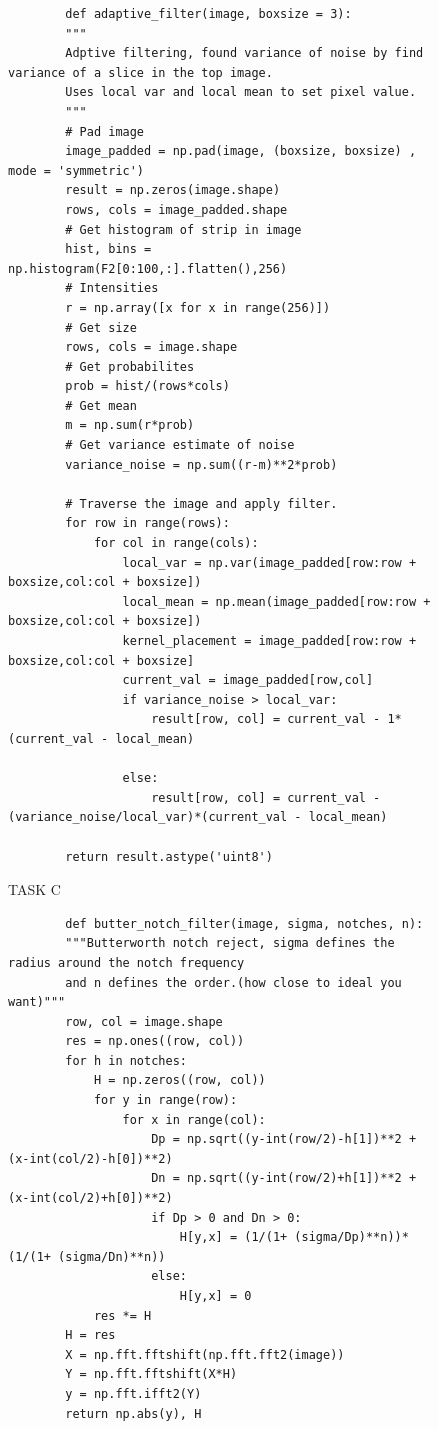 {\begin{figure}[H]
\begin{lstlisting}
        def adaptive_filter(image, boxsize = 3):
        """
        Adptive filtering, found variance of noise by find variance of a slice in the top image.
        Uses local var and local mean to set pixel value.
        """
        # Pad image
        image_padded = np.pad(image, (boxsize, boxsize) , mode = 'symmetric')
        result = np.zeros(image.shape)
        rows, cols = image_padded.shape
        # Get histogram of strip in image
        hist, bins = np.histogram(F2[0:100,:].flatten(),256)
        # Intensities
        r = np.array([x for x in range(256)])
        # Get size
        rows, cols = image.shape
        # Get probabilites
        prob = hist/(rows*cols)
        # Get mean
        m = np.sum(r*prob)
        # Get variance estimate of noise
        variance_noise = np.sum((r-m)**2*prob)
        
        # Traverse the image and apply filter.
        for row in range(rows):
            for col in range(cols):
                local_var = np.var(image_padded[row:row + boxsize,col:col + boxsize])
                local_mean = np.mean(image_padded[row:row + boxsize,col:col + boxsize])
                kernel_placement = image_padded[row:row + boxsize,col:col + boxsize] 
                current_val = image_padded[row,col]
                if variance_noise > local_var:
                    result[row, col] = current_val - 1*(current_val - local_mean)
                
                else:
                    result[row, col] = current_val - (variance_noise/local_var)*(current_val - local_mean)
        
        return result.astype('uint8')
    \end{lstlisting}
\caption{TASK C}
\label{TASK C}
\end{figure}




\begin{figure}[H]
    \begin{lstlisting}
        def butter_notch_filter(image, sigma, notches, n):
        """Butterworth notch reject, sigma defines the radius around the notch frequency
        and n defines the order.(how close to ideal you want)"""
        row, col = image.shape
        res = np.ones((row, col))
        for h in notches:
            H = np.zeros((row, col))
            for y in range(row):
                for x in range(col):
                    Dp = np.sqrt((y-int(row/2)-h[1])**2 + (x-int(col/2)-h[0])**2)
                    Dn = np.sqrt((y-int(row/2)+h[1])**2 + (x-int(col/2)+h[0])**2)
                    if Dp > 0 and Dn > 0:
                        H[y,x] = (1/(1+ (sigma/Dp)**n))*(1/(1+ (sigma/Dn)**n))
                    else:
                        H[y,x] = 0
            res *= H
        H = res
        X = np.fft.fftshift(np.fft.fft2(image))
        Y = np.fft.fftshift(X*H)
        y = np.fft.ifft2(Y)
        return np.abs(y), H


\end{lstlisting}
\end{figure}}
